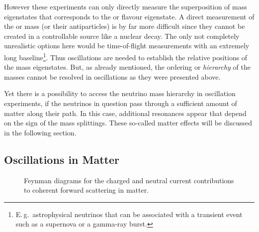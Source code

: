 However these experiments can only directly measure the superposition of mass
eigenstates that corresponds to the \nue or \nuebar flavour eigenstate. A direct
measurement of the \numu or \nutau mass (or their antiparticles) is by far more
difficult since they cannot be created in a controllable source like a nuclear
decay. The only not completely unrealistic options here would be time-of-flight
measurements with an extremely long baseline\footnote{E.\,g.\ astrophysical
neutrinos that can be associated with a transient event such as a supernova or a
gamma-ray burst.}. Thus oscillations are needed to establish the relative
positions of the mass eigenstates. But, as already mentioned, the ordering or
\emph{hierarchy} of the masses cannot be resolved in oscillations as they were
presented above.

Yet there is a possibility to access the neutrino mass hierarchy in oscillation
experiments, if the neutrinos in question pass through a sufficient amount of
matter along their path. In this case, additional resonances appear that depend
on the sign of the mass splittings. These so-called matter effects will be
discussed in the following section.

\subsection{Oscillations in Matter}
\label{sec:matter_osc}

\begin{figure}
 \centering
 \hspace{2cm}
 \caption{Feynman diagrams for the charged \protect{} and
  neutral \protect{} current contributions to coherent forward
  scattering in matter.}
\label{fig:coherent_scattering}
\end{figure}


